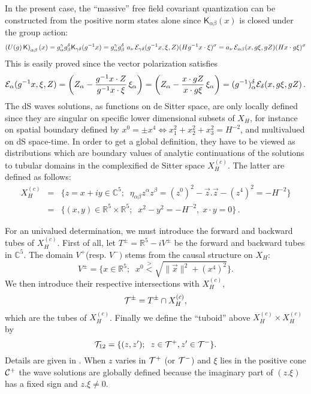 \documentclass[a4paper,11pt,showpacs,preprintnumbers]{revtex4}
\def\setR{\mathbb{R}}
\def\setC{\mathbb{C}}
\def\K{\textsf{K}}
\begin{document}
In the present case, the ``massive'' free field covariant
quantization can be constructed from the positive norm states
alone since $\K_{\alpha\beta}(x)$ is closed under the group
action:
\begin{equation}\label{eq:graction}
\left(U(g) \,\K\right)_{\alpha\beta}(x) = g_{\alpha}^{\gamma}
g_{\beta}^{\delta}\K_{\gamma \delta}(g^{-1} x)=g_{\alpha}^{\gamma}
g_{\beta}^{\delta}\,\,a_{\nu}\,{\cal
E}_{\gamma\delta}(g^{-1}x,\xi,Z)(H g^{-1}x\cdot
\xi)^{\sigma}=a_{\nu}\,{\cal E}_{\alpha\beta}(x,g\xi,gZ)(Hx\cdot
g\xi)^{\sigma}
\end{equation}
This is easily proved since the vector polarization satisfies
\begin{equation}
{\cal E}_{\alpha}(g^{-1}x,\xi,Z)=
\left(Z_{\alpha}-\frac{g^{-1}x\cdot Z}{g^{-1}x\cdot
\xi}\,{\xi_{\alpha}}\right)= \left(Z_{\alpha}-\frac{x\cdot
gZ}{x\cdot
g\xi}\,{\xi_{\alpha}}\right)=(g^{-1})_{\alpha}^{\delta}{\cal
E}_{\delta}(x,g\xi,gZ)\,.
\end{equation}
The dS waves solutions, as functions on de Sitter space,
 are only locally defined since they
are singular on specific lower dimensional subsets of $X_{H}$, for
instance on spatial boundary defined by $x^0 = \pm x^4
\Leftrightarrow x_1^2 + x_2^2 +x_3^2  = H^{-2} $, and multivalued
on dS space-time. In order to get a global definition, they have
to be viewed as distributions \cite{gesh} which are boundary
values of analytic continuations of the solutions to tubular
domains in the complexified de Sitter space $X_H^{(c)}$. The
latter are  defined as follows:
\begin{eqnarray}
X_H^{(c)}&=&\{z=x+iy\in  \setC^5;\;\;\eta_{\alpha \beta} z^\alpha
z^\beta=(z^0)^2-\vec z.\vec
z-(z^4)^2=-H^{-2}\}\nonumber\\
&=&\{ (x,y)\in\setR^5\times \setR^5;\;\; x^2-y^2=-H^{-2},\; x\cdot
y=0\}\,.\nonumber
\end{eqnarray}

For an univalued determination, we must introduce the forward and
backward tubes of $X_H^{(c)}$. First of all, let
$T^\pm=\setR^5-iV^\pm$ be the forward and backward tubes in
$\setC^5$. The domain $V^+$(resp. $V^-)$ stems from the causal
structure on $X_H$:
\begin{equation}
V^\pm=\{ x\in \setR^5;\;\; x^0\stackrel{>}{<}\sqrt{\parallel \vec
x\parallel^2+(x^4)^2} \}.
\label{cone}
\end{equation}
We then introduce their respective intersections with $X_H^{(c)}$,
\begin{equation}
{\cal T}^\pm=T^\pm\cap X_H^{(c)},
\end{equation}
which are the tubes of $X_H^{(c)}$. Finally we define the
``tuboid'' above $X_H^{(c)}\times X_H^{(c)}$ by
\begin{equation}
{\cal T}_{12}=\{ (z,z');\;\; z\in {\cal T}^+,z'\in {\cal T}^- \}.
\end{equation}
 Details are given in \cite{brmo}. When $z$
varies in ${\cal T}^+$ (or ${\cal T}^-$) and $\xi$ lies in the
positive cone ${\cal C}^+$ the  wave solutions are globally
defined because the imaginary part of $(z.\xi)$ has a fixed sign
and $z.\xi\neq 0$.
\end{document}
